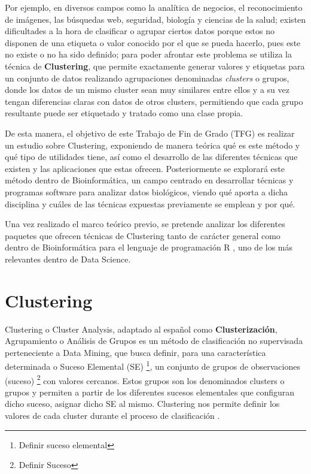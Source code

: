 \documentclass[3p,twocolumn]{elsarticle}
\begin{document}
Por ejemplo, en diversos campos como la analítica de negocios, el reconocimiento de imágenes, las búsquedas web, seguridad, biología y ciencias de la salud; existen dificultades a la hora de clasificar o agrupar ciertos datos porque estos no disponen de una etiqueta o valor conocido por el que se pueda hacerlo, pues este no existe o no ha sido definido; para poder afrontar este problema se utiliza la técnica de \textbf{Clustering}, que permite exactamente generar valores y etiquetas para un conjunto de datos realizando agrupaciones denominadas \textit{clusters} o grupos, donde los datos de un mismo cluster sean muy similares entre ellos y a su vez tengan diferencias claras con datos de otros clusters, permitiendo que cada grupo resultante puede ser etiquetado y tratado como una clase propia.

De esta manera, el objetivo de este Trabajo de Fin de Grado (TFG) es realizar un estudio sobre Clustering, exponiendo de manera teórica qué es este método y qué tipo de utilidades tiene, así como el desarrollo de las diferentes técnicas que existen y las aplicaciones que estas ofrecen. Posteriormente se explorará este método dentro de Bioinformática, un campo centrado en desarrollar técnicas y programas software para analizar datos biológicos, viendo qué aporta a dicha disciplina y cuáles de las técnicas expuestas previamente se emplean y por qué. 

Una vez realizado el marco teórico previo, se pretende analizar los diferentes paquetes que ofrecen técnicas de Clustering tanto de carácter general como dentro de Bioinformática para el lenguaje de programación R \cite{cita6}, uno de los más relevantes dentro de Data Science.





\clearpage
\section{Clustering} 



Clustering o Cluster Analysis, adaptado al español como \textbf{Clusterización}, Agrupamiento o Análisis de Grupos es un método de clasificación no supervisada perteneciente a Data Mining, que busca definir, para una característica determinada o Suceso Elemental (SE) \footnote{Definir suceso elemental}, un conjunto de grupos de observaciones (suceso) \footnote{Definir Suceso} con valores cercanos. Estos grupos son los denominados clusters o grupos y permiten a partir de los diferentes sucesos elementales que configuran dicho suceso, asignar dicho SE al mismo. Clustering nos permite definir los valores de cada cluster durante el proceso de clasificación \cite{cita5}.
\end{document}
